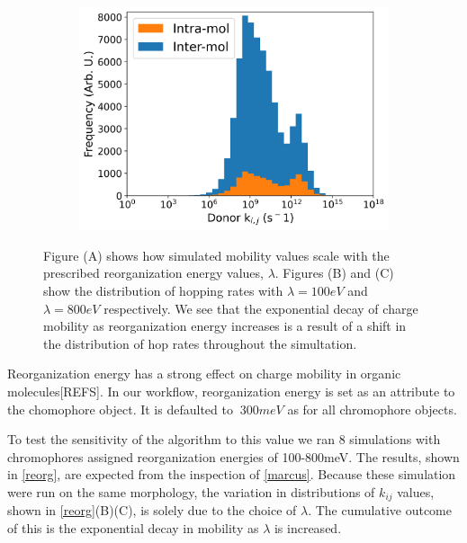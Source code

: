 \begin{figure}
\begin{subfigure}{.5\textwidth}
    \includegraphics[width=\textwidth]{figures/donor_hopping_rate_clusters_reorg800.png}
\end{subfigure}
    \caption{Figure (A) shows how  simulated mobility values scale with the prescribed
    reorganization energy values, $\lambda$. Figures (B) and (C) show the distribution of hopping rates with
    $\lambda = 100eV$ and $\lambda = 800eV$ respectively. We see that the exponential decay of charge mobility as
 reorganization energy increases is a result of a shift in the distribution of hop rates throughout the
    simultation.  
    }
\label{reorg}
\end{figure}

Reorganization energy has a strong effect on charge mobility in organic
molecules[REFS]. In our workflow, reorganization energy is set as an attribute
to the chomophore object. It is defaulted to $~300meV$ as for all chromophore
objects.

To test the sensitivity of the algorithm to this value we ran 8
simulations with chromophores assigned reorganization energies of 100-800meV. The results, shown in
\autoref{reorg}, are expected from the inspection of \autoref{marcus}. Because these simulation were run on
the same morphology, the variation in distributions of $k_{ij}$ values, shown in \autoref{reorg}(B)(C), is
solely due to the choice of $\lambda$. The cumulative outcome of this is the exponential decay in mobility as
$\lambda$ is increased.

